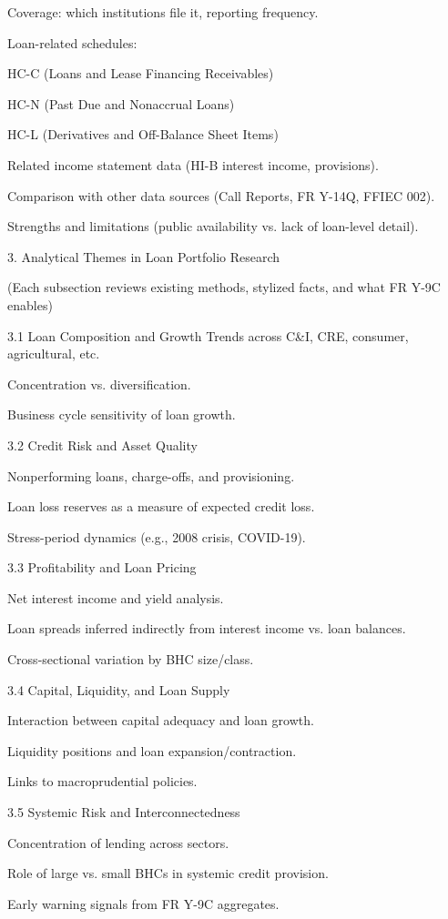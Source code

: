 \documentclass[conference]{IEEEtran}
\begin{document}
Coverage: which institutions file it, reporting frequency.

Loan-related schedules:

HC-C (Loans and Lease Financing Receivables)

HC-N (Past Due and Nonaccrual Loans)

HC-L (Derivatives and Off-Balance Sheet Items)

Related income statement data (HI-B interest income, provisions).

Comparison with other data sources (Call Reports, FR Y-14Q, FFIEC 002).

Strengths and limitations (public availability vs. lack of loan-level detail).

3. Analytical Themes in Loan Portfolio Research

(Each subsection reviews existing methods, stylized facts, and what FR Y-9C enables)

3.1 Loan Composition and Growth
Trends across C\&I, CRE, consumer, agricultural, etc.

Concentration vs. diversification.

Business cycle sensitivity of loan growth.

3.2 Credit Risk and Asset Quality

Nonperforming loans, charge-offs, and provisioning.

Loan loss reserves as a measure of expected credit loss.

Stress-period dynamics (e.g., 2008 crisis, COVID-19).

3.3 Profitability and Loan Pricing

Net interest income and yield analysis.

Loan spreads inferred indirectly from interest income vs. loan balances.

Cross-sectional variation by BHC size/class.

3.4 Capital, Liquidity, and Loan Supply

Interaction between capital adequacy and loan growth.

Liquidity positions and loan expansion/contraction.

Links to macroprudential policies.

3.5 Systemic Risk and Interconnectedness

Concentration of lending across sectors.

Role of large vs. small BHCs in systemic credit provision.

Early warning signals from FR Y-9C aggregates.
\end{document}
